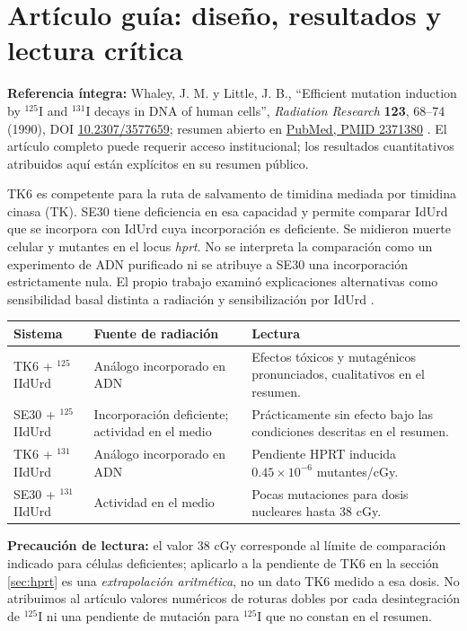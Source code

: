 \documentclass[11pt,a4paper]{article}
\begin{document}
\section{Artículo guía: diseño, resultados y lectura crítica}
\textbf{Referencia íntegra:} Whaley, J. M. y Little, J. B., ``Efficient mutation induction by $^{125}$I and $^{131}$I decays in DNA of human cells'', \emph{Radiation Research} \textbf{123}, 68--74 (1990), DOI \href{https://doi.org/10.2307/3577659}{10.2307/3577659}; resumen abierto en \href{https://pubmed.ncbi.nlm.nih.gov/2371380/}{PubMed, PMID 2371380} \cite{whaley}. El artículo completo puede requerir acceso institucional; los resultados cuantitativos atribuidos aquí están explícitos en su resumen público.

TK6 es competente para la ruta de salvamento de timidina mediada por timidina cinasa (TK). SE30 tiene deficiencia en esa capacidad y permite comparar IdUrd que se incorpora con IdUrd cuya incorporación es deficiente. Se midieron muerte celular y mutantes en el locus \emph{hprt}. No se interpreta la comparación como un experimento de ADN purificado ni se atribuye a SE30 una incorporación estrictamente nula. El propio trabajo examinó explicaciones alternativas como sensibilidad basal distinta a radiación y sensibilización por IdUrd \cite{whaley}.

\begin{center}\small\begin{tabular}{p{}p{}p{}}\toprule
Sistema & Fuente de radiación & Lectura \tabularnewline\midrule
TK6 + $^{125}$IIdUrd & Análogo incorporado en ADN & Efectos tóxicos y mutagénicos pronunciados, cualitativos en el resumen. \\
SE30 + $^{125}$IIdUrd & Incorporación deficiente; actividad en el medio & Prácticamente sin efecto bajo las condiciones descritas en el resumen. \\
TK6 + $^{131}$IIdUrd & Análogo incorporado en ADN & Pendiente HPRT inducida $0.45\times10^{-6}$ mutantes/cGy. \\
SE30 + $^{131}$IIdUrd & Actividad en el medio & Pocas mutaciones para dosis nucleares hasta $38$ cGy. \\
\bottomrule\end{tabular}\end{center}

\textbf{Precaución de lectura:} el valor $38$ cGy corresponde al límite de comparación indicado para células deficientes; aplicarlo a la pendiente de TK6 en la sección \ref{sec:hprt} es una \emph{extrapolación aritmética}, no un dato TK6 medido a esa dosis. No atribuimos al artículo valores numéricos de roturas dobles por cada desintegración de $^{125}$I ni una pendiente de mutación para $^{125}$I que no constan en el resumen.
\end{document}
